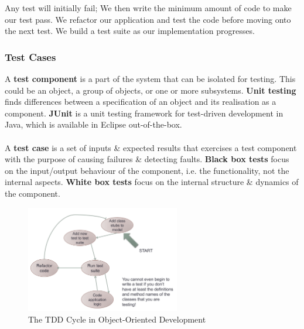 \documentclass[a4paper,11pt]{article}
\begin{document}
Any test will initially fail; We then write the minimum amount of code to make our test pass. 
We refactor our application and test the code before moving onto the next test.
We build a test suite as our implementation progresses.

\subsubsection{Test Cases}
A \textbf{test component} is a part of the system that can be isolated for testing. 
This could be an object, a group of objects, or one or more subsystems. 
\textbf{Unit testing} finds differences between a specification of an object and its realisation as a component.
\textbf{JUnit} is a unit testing framework for test-driven development in Java, which is available in Eclipse out-of-the-box.
\\\\ 
A \textbf{test case} is a set of inputs \& expected results that exercises a test component with the purpose of causing 
failures \& detecting faults. 
\textbf{Black box tests} focus on the input/output behaviour of the component, i.e. the functionality, not the internal aspects. 
\textbf{White box tests} focus on the internal structure \& dynamics of the component.
\begin{figure}[H]
    \centering
    \includegraphics[width=0.6\textwidth]{./images/tdd_cycle_oo.png}
    \caption{The TDD Cycle in Object-Oriented Development}
\end{figure}
\end{document}
